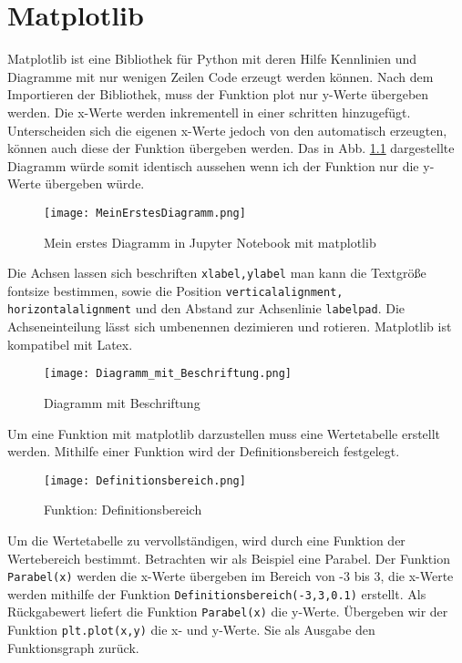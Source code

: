 \chapter{Matplotlib} \label{chap:matplotlib}

Matplotlib ist eine Bibliothek für Python mit deren Hilfe  Kennlinien und Diagramme mit nur wenigen Zeilen Code erzeugt werden können.  Nach dem Importieren der Bibliothek, muss der Funktion plot nur y-Werte übergeben werden. Die x-Werte werden inkrementell in einer schritten hinzugefügt. Unterscheiden sich die eigenen x-Werte jedoch von den automatisch erzeugten, können auch diese der Funktion übergeben werden. Das in Abb. \ref{img:MPL1} dargestellte Diagramm würde somit identisch aussehen wenn ich der Funktion nur die y-Werte übergeben würde. 

\begin{figure}[!htb]
\texttt{[image: MeinErstesDiagramm.png]}
\caption{Mein erstes Diagramm in Jupyter Notebook mit matplotlib }
\label{img:MPL1}
\end{figure}

Die Achsen lassen sich beschriften \texttt{xlabel,ylabel} man kann die Textgröße fontsize  bestimmen, sowie die Position \texttt{verticalalignment, horizontalalignment} und den Abstand zur Achsenlinie \texttt{labelpad}. Die Achseneinteilung lässt sich umbenennen dezimieren und rotieren. Matplotlib ist kompatibel mit Latex. 

\begin{figure}[!htb]
\texttt{[image: Diagramm\_mit\_Beschriftung.png]}
\caption{Diagramm mit Beschriftung}
\label{img:DiagrammMitBeschriftung}
\end{figure}

Um eine Funktion mit matplotlib darzustellen muss  eine Wertetabelle erstellt werden. Mithilfe einer Funktion wird der Definitionsbereich festgelegt.

\begin{figure}[!htb]
\texttt{[image: Definitionsbereich.png]}
\caption{Funktion: Definitionsbereich}
\label{img:Definitionsbereich}
\end{figure}

Um die Wertetabelle zu vervollständigen, wird durch eine Funktion der Wertebereich bestimmt. Betrachten wir als Beispiel eine Parabel. Der Funktion \texttt{Parabel(x)} werden die x-Werte übergeben im Bereich von -3 bis 3, die x-Werte werden mithilfe der Funktion \texttt{Definitionsbereich(-3,3,0.1)} erstellt. Als Rückgabewert liefert die Funktion \texttt{Parabel(x)} die y-Werte. Übergeben wir der Funktion \texttt{plt.plot(x,y)} die x- und y-Werte. Sie als Ausgabe den Funktionsgraph zurück.

